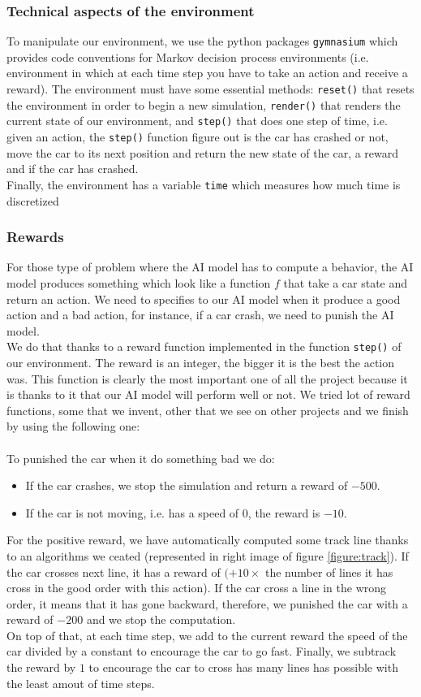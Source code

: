 \documentclass[11pt,a4paper]{article}
\newcounter{fig}
\newcommand{\mlist}[1]{\begin{itemize}[noitemsep,topsep=0pt]#1\end{itemize}}
\begin{document}
			\subsubsection*{Technical aspects of the environment}
To manipulate our environment, we use the python packages \texttt{gymnasium} which provides code conventions for Markov decision process environments (i.e. environment in which at each time step you have to take an action and receive a reward). 
The environment must have some essential methods: \texttt{reset()} that resets the environment in order to begin a new simulation, \texttt{render()} that renders the current state of our environment, 
and \texttt{step()} that does one step of time, i.e. given an action, the \texttt{step()} function figure out is the car has crashed or not, move the car to its next position and return the new state of the car, a reward and if the car has crashed.\\
Finally, the environment has a variable \texttt{time} which measures how much time is discretized
		
			\subsubsection*{Rewards}
For those type of problem where the AI model has to compute a behavior, the AI model produces something which look like a function $f$ that take a car state and return an action. We need to specifies to our AI model when it produce a good action and a bad action, for instance, if a car crash, we need to punish the AI model.\\
We do that thanks to a reward function implemented in the function \texttt{step()} of our environment. The reward is an integer, the bigger it is the best the action was. This function is clearly the most important one of all the project because it is thanks to it that our AI model will perform well or not. We tried lot of reward functions, some that we invent, other that we see on other projects and we finish by using the following one:\\
\\
To punished the car when it do something bad we do:
\mlist{
\item If the car crashes, we stop the simulation and return a reward of $-500$.
\item If the car is not moving, i.e. has a speed of $0$, the reward is $-10$.
}
For the positive reward, we have automatically computed some track line thanks to an algorithms we ceated (represented in right image of figure \ref{figure:track}). If the car crosses next line, it has a reward of $(+10\times$ the number of lines it has cross in the good order with this action). If the car cross a line in the wrong order, it means that it has gone backward, therefore, we punished the car with a reward of $-200$ and we stop the computation.\\
On top of that, at each time step, we add to the current reward the speed of the car divided by a constant to encourage the car to go fast. Finally, we subtrack the reward by $1$ to encourage the car to cross has many lines has possible with the least amout of time steps.
\end{document}
